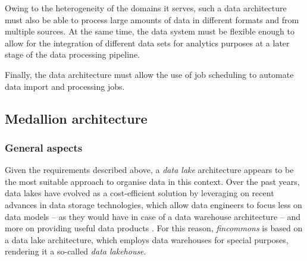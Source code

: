 \documentclass[a4paper, 11pt]{report}
\begin{document}
Owing to the heterogeneity of the domains it serves, such a data architecture must also be able to process large amounts of data in different formats and from multiple sources. At the same time, the data system must be flexible enough to allow for the integration of different data sets for analytics purposes at a later stage of the data processing pipeline.


Finally, the data architecture must allow the use of job scheduling to automate data import and processing jobs.

\subsection{Medallion architecture}

\subsubsection{General aspects}

Given the requirements described above, a \emph{data lake} architecture appears to be the most suitable approach to organise data in this context. Over the past years, data lakes have evolved as a cost-efficient solution by leveraging on recent advances in data storage technologies, which allow data engineers to focus less on data models -- as they would have in case of a data warehouse architecture -- and more on providing useful data products \parencite{Gorelik.2019}. For this reason, \emph{fincommons} is based on a data lake architecture, which employs data warehouses for special purposes, rendering it a so-called \emph{data lakehouse}.
\end{document}
